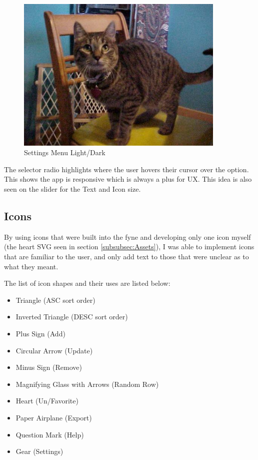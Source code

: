 \begin{figure}[htb]
	\centering
	\includegraphics[width=10cm]{./Images/cats_00001.jpg}
	\caption{Settings Menu Light/Dark}
	\label{fig:DBOperations}
\end{figure}

The selector radio highlights where the user hovers their cursor over
the option. This shows the app is responsive which is always a plus for UX.
This idea is also seen on the slider for the Text and Icon size.

\subsection{Icons}

By using icons that were built into the fyne and developing only one
icon myself (the heart SVG seen in section \ref{subsubsec:Assets}), I
was able to implement icons that are familiar to the user, and only
add text to those that were unclear as to what they meant.

The list of icon shapes and their uses are listed below:
\begin{itemize}
	\item Triangle (ASC sort order)
	\item Inverted Triangle (DESC sort order)
	\item Plus Sign (Add)
	\item Circular Arrow (Update)
	\item Minus Sign (Remove)
	\item Magnifying Glass with Arrows (Random Row)
	\item Heart (Un/Favorite)
	\item Paper Airplane (Export)
	\item Question Mark (Help)
	\item Gear (Settings)
\end{itemize}

